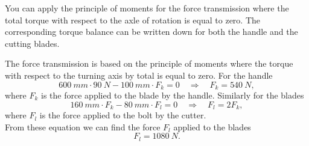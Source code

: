 {\ifEngHint
You can apply the principle of moments for the force transmission where the total torque with respect to the axle of rotation is equal to zero. The corresponding torque balance can be written down for both the handle and the cutting blades.
\fi


\ifEngSolution
The force transmission is based on the principle of moments where the torque with respect to the turning axis by total is equal to zero. For the handle
\[ \SI{600}{mm}\cdot\SI{90}{N}-\SI{100}{mm}\cdot F_k = 0 \quad\Rightarrow\quad F_k = \SI{540}{N}, \]
where $F_k$ is the force applied to the blade by the handle. Similarly for the blades
\[ \SI{160}{mm}\cdot F_k - \SI{80}{mm}\cdot F_l = 0 \quad\Rightarrow\quad F_l = 2F_k, \]
where $F_l$ is the force applied to the bolt by the cutter.\\
From these equation we can find the force $F_l$ applied to the blades
\[ F_l = \SI{1080}{N}.\]
\fi
}